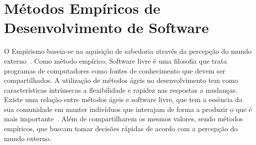 \section{Métodos Empíricos de Desenvolvimento de Software}
\label{sec:desenvolvimento-empirico}

O Empirismo baseia-se na aquisição de sabedoria através da percepção do mundo 
externo~\cite{chaui2003}.	
%
Como método empírico, Software livre é uma filosofia que trata programas de computadores como fontes de conhecimento que devem ser compartilhados.
%
A utilização de métodos ágeis no desenvolvimento tem como características 
intrínsecas a flexibilidade e rapidez nas respostas a mudanças. 
%
Existe uma relação entre métodos ágeis e software livre, que tem a essência da sua comunidade em manter indivíduos que interajam de forma a produzir o que é mais importante~\cite{corbucci2011}. Além de compartilharem os mesmos valores, sendo métodos empíricos, que buscam tomar decisões rápidas de acordo com a percepção do mundo externo.


